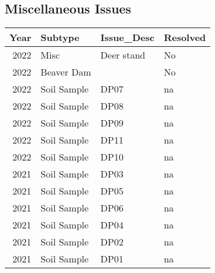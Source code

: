 \documentclass[
  landscape]{article}
\begin{document}
\hypertarget{miscellaneous-issues}{%
\subsection{Miscellaneous Issues}\label{miscellaneous-issues}}

\begin{longtable}[]{@{}rlll@{}}
\toprule()
Year & Subtype & Issue\_Desc & Resolved \\
\midrule()
\endhead
2022 & Misc & Deer stand & No \\
2022 & Beaver Dam & & No \\
2022 & Soil Sample & DP07 & na \\
2022 & Soil Sample & DP08 & na \\
2022 & Soil Sample & DP09 & na \\
2022 & Soil Sample & DP11 & na \\
2022 & Soil Sample & DP10 & na \\
2021 & Soil Sample & DP03 & na \\
2021 & Soil Sample & DP05 & na \\
2021 & Soil Sample & DP06 & na \\
2021 & Soil Sample & DP04 & na \\
2021 & Soil Sample & DP02 & na \\
2021 & Soil Sample & DP01 & na \\
\bottomrule()
\end{longtable}
\end{document}
